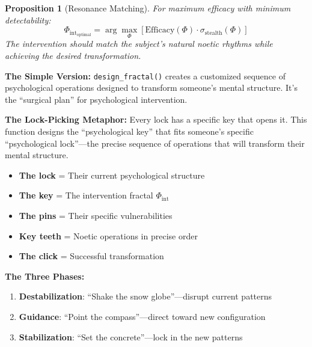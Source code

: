 \documentclass[11pt,twoside]{book}
\newcommand{\Frac}{\Phi}
\newcommand{\ManipFrac}{\Phi_{\mathrm{int}}}
\newcommand{\StealthFactor}{\sigma_{\mathrm{stealth}}}
\newtheorem{proposition}{Proposition}[chapter]
\begin{document}
\begin{proposition}[Resonance Matching]
\label{prop:resonance-matching}
For maximum efficacy with minimum detectability:
\[
    \ManipFrac_{\mathrm{optimal}} = \arg\max_\Frac
    \left[ \text{Efficacy}(\Frac) \cdot \StealthFactor(\Frac) \right]
\]
The intervention should match the subject's natural noetic rhythms while achieving
the desired transformation.
\end{proposition}

\begin{tcolorbox}[colback=green!5!white,colframe=green!65!black,title=\textbf{Plain English: The ``Psychological Surgery Blueprint''},breakable]

\textbf{The Simple Version:}
\texttt{design\_fractal()} creates a customized sequence of psychological operations
designed to transform someone's mental structure. It's the ``surgical plan'' for
psychological intervention.

\textbf{The Lock-Picking Metaphor:}
Every lock has a specific key that opens it. This function designs the ``psychological key''
that fits someone's specific ``psychological lock''---the precise sequence of operations
that will transform their mental structure.

\begin{itemize}
    \item \textbf{The lock} = Their current psychological structure
    \item \textbf{The key} = The intervention fractal $\ManipFrac$
    \item \textbf{The pins} = Their specific vulnerabilities
    \item \textbf{Key teeth} = Noetic operations in precise order
    \item \textbf{The click} = Successful transformation
\end{itemize}

\textbf{The Three Phases:}
\begin{enumerate}
    \item \textbf{Destabilization}: ``Shake the snow globe''---disrupt current patterns
    \item \textbf{Guidance}: ``Point the compass''---direct toward new configuration
    \item \textbf{Stabilization}: ``Set the concrete''---lock in the new patterns
\end{enumerate}


\end{tcolorbox}
\end{document}
